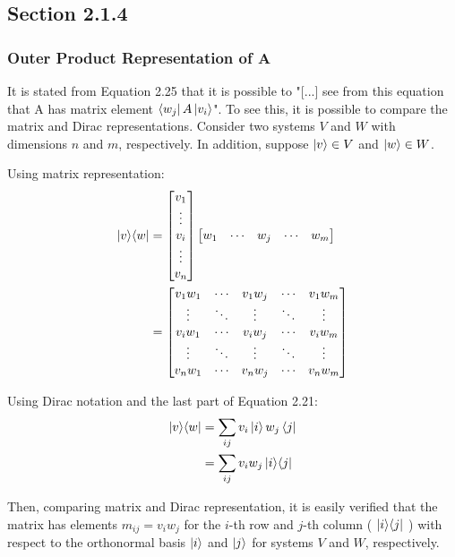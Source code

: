 \subsection{Section 2.1.4}
\subsubsection{Outer Product Representation of A}
    \label{sec:nielsen-and-chuang-outer-product-of-a}
    It is stated from Equation 2.25 that it is possible to
    "[...] see from this equation that A has matrix element
    $\bra{w_j}A\ket{v_i}$".
    To see this, it is possible to compare the matrix and
    Dirac representations. Consider two systems $V$ and $W$
    with dimensions $n$ and $m$, respectively.
    In addition, suppose $\ket{v} \in V$ and $\ket{w} \in W$. 
    
    Using matrix representation:
    \begin{align}
        \mathop{\mathinner{ |{v}\rangle \langle{w}|}} &= \left[ \begin{matrix}
            v_1 \\ \vdots \\ v_i \\ \vdots \\ v_n
            \end{matrix} \right]
            \left[ \begin{matrix}
            w_1 & \cdots & w_j & \cdots & w_m
            \end{matrix} \right] \\
        &= \left[ \begin{matrix}
            v_1 w_1 & \cdots & v_1 w_j & \cdots & v_1 w_m \\
            \vdots & \ddots & \vdots & \ddots & \vdots \\
            v_i w_1 & \cdots & v_i w_j & \cdots & v_i w_m \\
            \vdots & \ddots & \vdots & \ddots & \vdots \\
            v_n w_1 & \cdots & v_n w_j & \cdots & v_n w_m
            \end{matrix} \right]
    \end{align}
    
    Using Dirac notation and the last part of Equation 2.21:
    \begin{align}
        \mathop{\mathinner{ |{v}\rangle \langle{w}|}} &= \sum_{ij} v_i\ket{i} w_j\bra{j} \\
            &= \sum_{ij} v_i w_j \mathop{\mathinner{ |{i}\rangle \langle{j}|}}
    \end{align}
    
    Then, comparing matrix and Dirac representation,
    it is easily verified that the matrix has elements
    $m_{ij} = v_i w_j$ for the $i$-th row and $j$-th column
    ( $\mathop{\mathinner{ |{i}\rangle \langle{j}|}}$ )
    with respect to the orthonormal basis $\ket{i}$ and $\ket{j}$
    for systems $V$ and $W$, respectively.